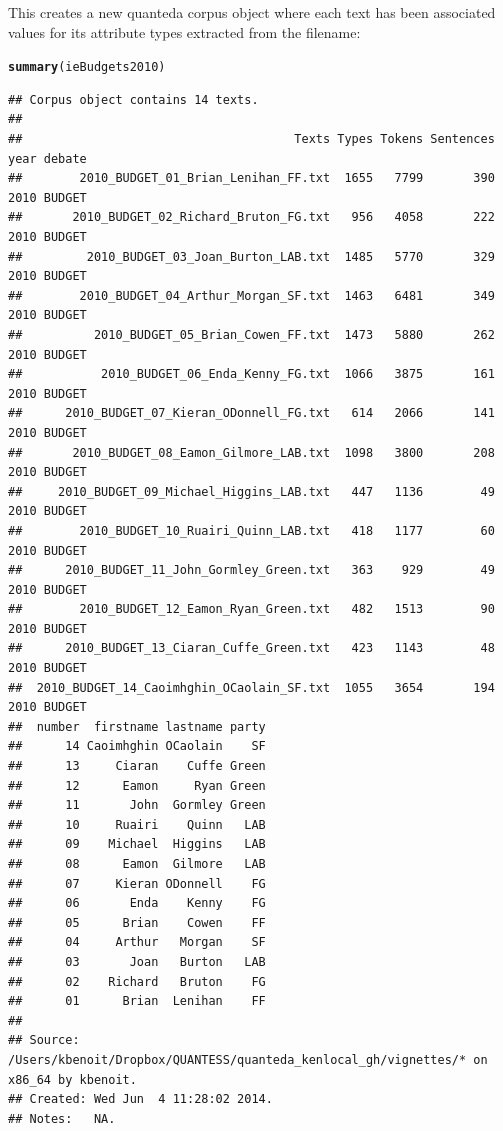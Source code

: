 \documentclass[11pt]{article}\usepackage[]{graphicx}\usepackage[]{color}
\makeatletter
\newcommand{\hlstd}[1]{\textcolor[rgb]{0.345,0.345,0.345}{#1}}%
\newcommand{\hlkwd}[1]{\textcolor[rgb]{0.737,0.353,0.396}{\textbf{#1}}}%
\newenvironment{kframe}{%
 \def\at@end@of@kframe{}%
 \ifinner\ifhmode%
  \def\at@end@of@kframe{\end{minipage}}%
  \begin{minipage}{\columnwidth}%
 \fi\fi%
 \def\FrameCommand##1{\hskip\@totalleftmargin \hskip-\fboxsep
 \colorbox{shadecolor}{##1}\hskip-\fboxsep
     \hskip-\linewidth \hskip-\@totalleftmargin \hskip\columnwidth}%
 \MakeFramed {\advance\hsize-\width
   \@totalleftmargin\z@ \linewidth\hsize
   \@setminipage}}%
 {\par\unskip\endMakeFramed%
 \at@end@of@kframe}
\newenvironment{knitrout}{}{} %
\makeatother
\begin{document}
This creates a new quanteda corpus object where each text has been associated values for its attribute types extracted from the filename:

\begin{knitrout}\footnotesize
{}\color{fgcolor}\begin{kframe}
\begin{alltt}
\hlkwd{summary}\hlstd{(ieBudgets2010)}
\end{alltt}
\begin{verbatim}
## Corpus object contains 14 texts.
## 
##                                      Texts Types Tokens Sentences year debate
##        2010_BUDGET_01_Brian_Lenihan_FF.txt  1655   7799       390 2010 BUDGET
##       2010_BUDGET_02_Richard_Bruton_FG.txt   956   4058       222 2010 BUDGET
##         2010_BUDGET_03_Joan_Burton_LAB.txt  1485   5770       329 2010 BUDGET
##        2010_BUDGET_04_Arthur_Morgan_SF.txt  1463   6481       349 2010 BUDGET
##          2010_BUDGET_05_Brian_Cowen_FF.txt  1473   5880       262 2010 BUDGET
##           2010_BUDGET_06_Enda_Kenny_FG.txt  1066   3875       161 2010 BUDGET
##      2010_BUDGET_07_Kieran_ODonnell_FG.txt   614   2066       141 2010 BUDGET
##       2010_BUDGET_08_Eamon_Gilmore_LAB.txt  1098   3800       208 2010 BUDGET
##     2010_BUDGET_09_Michael_Higgins_LAB.txt   447   1136        49 2010 BUDGET
##        2010_BUDGET_10_Ruairi_Quinn_LAB.txt   418   1177        60 2010 BUDGET
##      2010_BUDGET_11_John_Gormley_Green.txt   363    929        49 2010 BUDGET
##        2010_BUDGET_12_Eamon_Ryan_Green.txt   482   1513        90 2010 BUDGET
##      2010_BUDGET_13_Ciaran_Cuffe_Green.txt   423   1143        48 2010 BUDGET
##  2010_BUDGET_14_Caoimhghin_OCaolain_SF.txt  1055   3654       194 2010 BUDGET
##  number  firstname lastname party
##      14 Caoimhghin OCaolain    SF
##      13     Ciaran    Cuffe Green
##      12      Eamon     Ryan Green
##      11       John  Gormley Green
##      10     Ruairi    Quinn   LAB
##      09    Michael  Higgins   LAB
##      08      Eamon  Gilmore   LAB
##      07     Kieran ODonnell    FG
##      06       Enda    Kenny    FG
##      05      Brian    Cowen    FF
##      04     Arthur   Morgan    SF
##      03       Joan   Burton   LAB
##      02    Richard   Bruton    FG
##      01      Brian  Lenihan    FF
## 
## Source:  /Users/kbenoit/Dropbox/QUANTESS/quanteda_kenlocal_gh/vignettes/* on x86_64 by kbenoit.
## Created: Wed Jun  4 11:28:02 2014.
## Notes:   NA.
\end{verbatim}
\end{kframe}
\end{knitrout}
\end{document}
